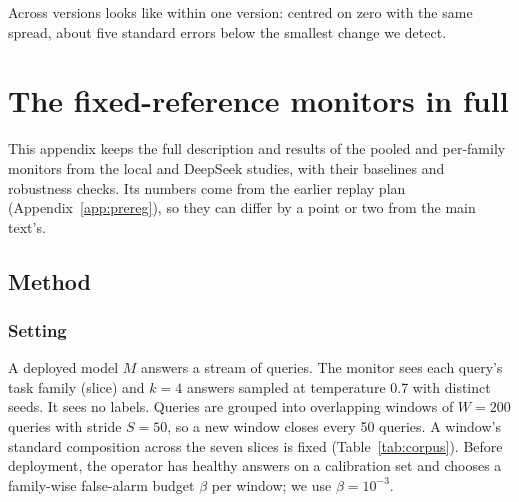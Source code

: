 \documentclass[11pt]{article}
\begin{document}
\begin{center}\small
{}
\end{center}

\noindent Across versions looks like within one version: centred on zero with the
same spread, about five standard errors below the smallest change we detect.

\section{The fixed-reference monitors in full}
\label{app:fixed}

This appendix keeps the full description and results of the pooled and per-family
monitors from the local and DeepSeek studies, with their baselines and robustness
checks. Its numbers come from the earlier replay plan (Appendix~\ref{app:prereg}),
so they can differ by a point or two from the main text's.

\subsection{Method}
\label{app:fixed-method}

\subsubsection{Setting}
A deployed model $M$ answers a stream of queries. The monitor sees each query's
task family (slice) and $k=4$ answers sampled at temperature 0.7 with distinct
seeds. It sees no labels. Queries are grouped into overlapping windows of $W=200$
queries with stride $S=50$, so a new window closes every 50 queries. A window's
standard composition across the seven slices is fixed
(Table~\ref{tab:corpus}). Before deployment, the operator has healthy answers on a
calibration set and chooses a family-wise false-alarm budget $\beta$ per window;
we use $\beta=10^{-3}$.
\end{document}
